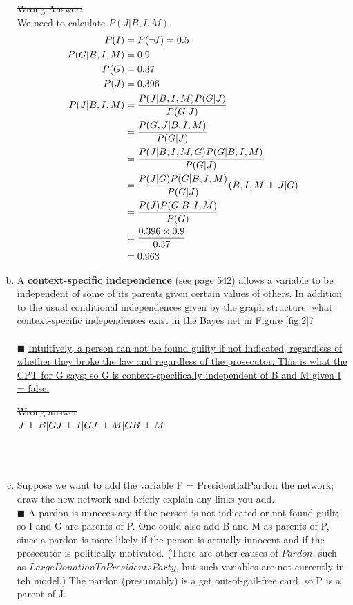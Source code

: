 \documentclass{article}
\newcommand{\solution}[1]{~\\ $\blacksquare$ \sffamily\upshape\selectfont #1
\normalfont ~\\~ }
\newcommand\independent{\protect\mathpalette{\protect\independenT}{\perp}}
\def\independenT#1#2{\mathrel{\rlap{$#1#2$}\mkern2mu{#1#2}}}
\begin{document}
\begin{enumerate}[a.]
{  \sout{Wrong Answer: }\\ 
  We need to calculate $P(J|B,I,M)$. \\
  \begin{align*}
    P(I) & = P(\neg I) = 0.5 \\
    P(G|B,I,M) & = 0.9 \\ 
    P(G) & = 0.37 \\
    P(J) & = 0.396 \\
    P(J|B,I,M) & = \frac{P(J|B,I,M)P(G|J)}{P(G|J)} \\
    & = \frac{P(G,J|B,I,M)}{P(G|J)} \\ 
    & = \frac{P(J|B,I,M,G)P(G|B,I,M)}{P(G|J)} \\
    & = \frac{P(J|G)P(G|B,I,M)}{P(G|J)} (B,I,M\independent{J|G}) \\
    & = \frac{P(J)P(G|B,I,M)}{P(G)} \\
    & = \frac{0.396\times 0.9}{0.37} \\
    & = 0.963 
  \end{align*}
}
\item A \textbf{context-specific independence} (see page 542) allows a
  variable to be independent of some of its parents given certain
  values of others. In addition to the usual conditional independences
  given by the graph structure, what context-specific independences
  exist in the Bayes net in Figure \ref{fig:2}? \\
  \solution{
  \uline{Intuitively, a person can not be found guilty if not
    indicated, regardless of whether they broke the law and regardless of
    the prosecutor. This is what the CPT for G says; so G is
    context-specifically independent of B and M given I = false.}

  \sout{Wrong answer} \\
  $ J\independent{B|G} \\
  J\independent{I|G} \\
  J\independent{M|G} \\
  B\independent{M} $
}
\item Suppose we want to add the variable P =  PresidentialPardon the
network; draw the new network and briefly explain any links you add.
\solution{
A pardon is unnecessary if the person is not indicated or not found
guilt; so I and G are parents of P. One could also add B and M as
parents of P, since a pardon is more likely if the person is actually
innocent and if the prosecutor is politically motivated. (There are
other causes of $Pardon$, such as $LargeDonationToPresidentsParty$,
but such variables are not currently in teh model.) The pardon
(presumably) is a get out-of-gail-free card, so P is a parent of J. 

}
\end{enumerate}
\end{document}

